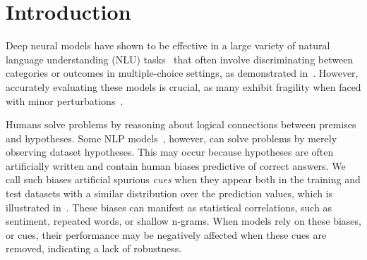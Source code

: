\section{Introduction}
\label{sec:intro}

Deep neural models have shown to be effective in a large variety of natural language
understanding (NLU) tasks~\cite{bowman2015large,wang2018glue,mostafazadeh2016corpus,roemmele2011choice,zellers2018swag} that often involve discriminating between 
categories or outcomes in multiple-choice settings, as demonstrated in~. 
However, accurately evaluating these models is crucial, 
as many exhibit fragility when faced with minor perturbations~\cite{checklist2020acl}.
\begin{center}
\end{center}

Humans solve problems by reasoning about logical connections 
between premises and hypotheses. 
Some NLP models~\cite{naik2018stress,schuster2019towards}, 
however, can solve problems by merely observing dataset hypotheses. 
This may occur because hypotheses are often artificially 
written and contain human biases predictive of correct answers. 
We call such biases artificial spurious \textit{cues} when
they appear both in the training and test datasets with a similar distribution
over the prediction values, which is illustrated in~.
These biases can manifest as statistical correlations, 
such as sentiment, repeated words, or shallow n-grams. 
When models rely on these biases, or cues, 
their performance may be negatively affected 
when these cues are removed, indicating a lack of robustness.


